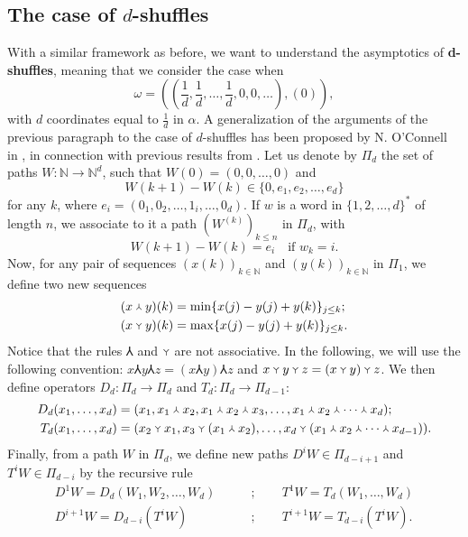 \documentclass[smallextended,nospthms]{svjour3}
\theoremstyle{remark}
\newcommand{\N}{\mathbb{N}}
\begin{document}
\subsection{The case of $d$-shuffles}
With a similar framework as before, we want to understand the asymptotics of \textbf{d-shuffles}, meaning that we consider the case when
$$\omega=\left(\left(\frac{1}{d},\frac{1}{d},\ldots,\frac{1}{d},0,0,\ldots \right),(0)\right),$$
with $d$ coordinates equal to $\frac{1}{d}$ in $\alpha$. A generalization of the arguments of the previous paragraph to the case of $d$-shuffles has been proposed by N. O'Connell in \cite{OC03}, in connection with previous results from \cite{OCY02}. Let us denote by $\Pi_{d}$ the set of paths $W : \N \to \N^{d}$, such that $W(0)=(0,0,\ldots,0)$ and 
$$W(k+1)-W(k) \in \{0,e_{1},e_{2},\ldots,e_{d}\}$$
for any $k$, where $e_{i}=(0_{1},0_{2},\ldots,1_{i},\ldots,0_{d})$. 
If $w$ is a word in $\{1,2,\ldots,d\}^{*}$ of length $n$, we associate to it a path $(W^{(k)})_{k \leq n}$ in $\Pi_{d}$, with
$$W(k+1)-W(k)=e_{i}\quad\text{if }w_{k}=i.$$
Now, for any pair of sequences $(x(k))_{k\in \N}$ and $(y(k))_{k \in \N}$ in $\Pi_{1}$, we define two new sequences 
\begin{align*}
(x \Yup y)(k) &= \min \{x(j)-y(j) +y(k) \}_{j \leq k};\\
(x \Ydown y)(k) &= \max \{ x(j)-y(j)+y(k)\}_{j \leq k}.
\end{align*}
Notice that the rules $\Yup$ and $\Ydown$ are not associative. In the following, we will use the following convention: $x \Yup y \Yup z = (x \Yup y) \Yup z$ and $x \Ydown y \Ydown z = (x \Ydown y) \Ydown z$. We then define operators $D_{d} : \Pi_{d} \to \Pi_{d}$ and $T_{d} :  \Pi_{d} \to \Pi_{d-1}$:
\begin{align*}
D_{d}(x_{1},\ldots,x_{d})&=(x_{1},x_{1}\Yup x_{2},x_{1}\Yup x_{2}\Yup x_{3},\ldots,x_{1}\Yup x_{2}\Yup \cdots \Yup x_{d});\\
T_{d}(x_{1},\ldots,x_{d})&=(x_{2}\Ydown x_{1},x_{3}\Ydown (x_{1}\Yup x_{2}),\ldots,x_{d}\Ydown(x_{1}\Yup x_{2}\Yup \cdots \Yup x_{d-1})).
\end{align*}
Finally, from a path $W$ in $\Pi_{d}$, we define new paths $D^{i}W \in \Pi_{d-i+1}$ and $T^{i}W \in \Pi_{d-i}$ by the recursive rule 
\begin{align*} D^{1}W=D_{d}(W_{1},W_{2},\ldots,W_{d})\qquad&;\qquad T^{1}W=T_{d}(W_{1},\ldots,W_{d})\\
D^{i+1}W=D_{d-i}(T^{i}W)\qquad&;\qquad T^{i+1}W=T_{d-i}(T^{i}W).
\end{align*}
\end{document}
